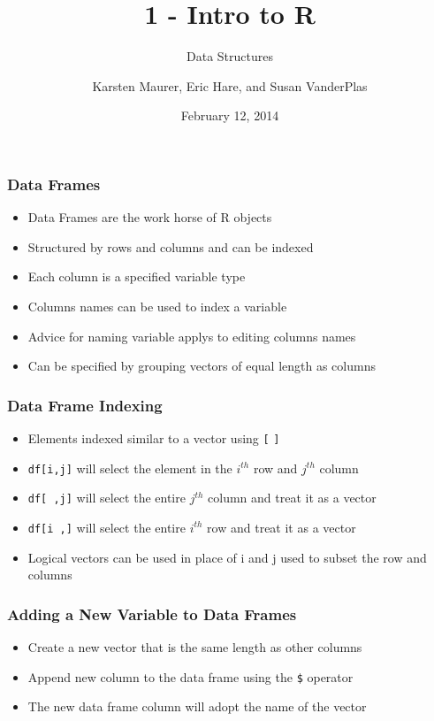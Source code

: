 \documentclass{beamer}\usepackage[]{graphicx}\usepackage[]{color}
\title[ 1-Intro]{1 - Intro to R}
\subtitle{Data Structures}
\author[ K. Maurer, S. VanderPlas, E. Hare]{Karsten Maurer, Eric Hare, and Susan VanderPlas}
\date{February 12, 2014}
\institute[ISU]{Iowa State University}
\begin{document}
\begin{frame}
    \maketitle
\end{frame}


\begin{frame}
    \frametitle{Data Frames}
    \begin{itemize}
        \item Data Frames are the work horse of R objects
        \item Structured by rows and columns and can be indexed
        \item Each column is a specified variable type
        \item Columns names can be used to index a variable
        \item Advice for naming variable applys to editing columns names
        \item Can be specified by grouping vectors of equal length as columns
    \end{itemize}    
\end{frame}

\begin{frame}[fragile]
    \frametitle{Data Frame Indexing}
    \begin{itemize}
        \item Elements indexed similar to a vector using \texttt{[} \texttt{]}
        \item \texttt{df[i,j]} will select the element in the $i^{th}$ row and $j^{th}$ column
        \item \texttt{df[ ,j]} will select the entire $j^{th}$ column and treat it as a vector
        \item \texttt{df[i ,]} will select the entire $i^{th}$ row and treat it as a vector
        \item Logical vectors can be used in place of i and j used to subset the row and columns
    \end{itemize}
\end{frame}


\begin{frame}
    \frametitle{Adding a New Variable to Data Frames}
    \begin{itemize}
        \item Create a new vector that is the same length as other columns
        \item Append new column to the data frame using the \texttt{\$} operator
        \item The new data frame column will adopt the name of the vector
    \end{itemize}
\end{frame}
\end{document}
